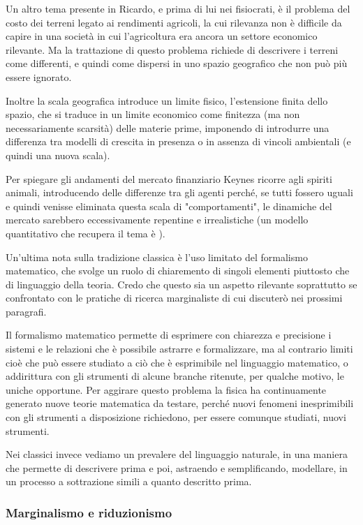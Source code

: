 \documentclass[a4paper, headings=standardclasses]{scrartcl}
\begin{document}
Un altro tema presente in Ricardo, e prima di lui nei fisiocrati, è il problema del costo dei terreni legato ai rendimenti agricoli, la cui rilevanza non è difficile da capire in una società in cui l'agricoltura era ancora un settore economico rilevante. Ma la trattazione di questo problema richiede di descrivere i terreni come differenti, e quindi come dispersi in uno spazio geografico che non può più essere ignorato.

Inoltre la scala geografica introduce un limite fisico, l'estensione finita dello spazio, che si traduce in un limite economico come finitezza (ma non necessariamente scarsità) delle materie prime, imponendo di introdurre una differenza tra modelli di crescita in presenza o in assenza di vincoli ambientali (e quindi una nuova scala).

Per spiegare gli andamenti del mercato finanziario Keynes ricorre agli spiriti animali, introducendo delle differenze tra gli agenti perché, se tutti fossero uguali e quindi venisse eliminata questa scala di "comportamenti", le dinamiche del mercato sarebbero eccessivamente repentine e irrealistiche (un modello quantitativo che recupera il tema è \textcite{day1990}).

Un'ultima nota sulla tradizione classica è l'uso limitato del formalismo matematico, che svolge un ruolo di chiaremento di singoli elementi piuttosto che di linguaggio della teoria. Credo che questo sia un aspetto rilevante soprattutto se confrontato con le pratiche di ricerca marginaliste di cui discuterò nei prossimi paragrafi.

Il formalismo matematico permette di esprimere con chiarezza e precisione i sistemi e le relazioni che è possibile astrarre e formalizzare, ma al contrario limiti cioè che può essere studiato a ciò che è esprimibile nel linguaggio matematico, o addirittura con gli strumenti di alcune branche ritenute, per qualche motivo, le uniche opportune.
Per aggirare questo problema la fisica ha continuamente generato nuove teorie matematica da testare, perché nuovi fenomeni inesprimibili con gli strumenti a disposizione richiedono, per essere comunque studiati, nuovi strumenti.

Nei classici invece vediamo un prevalere del linguaggio naturale, in una maniera che permette di descrivere prima e poi, astraendo e semplificando, modellare, in un processo a sottrazione simili a quanto descritto prima.

\subsubsection{Marginalismo e riduzionismo}
\end{document}
